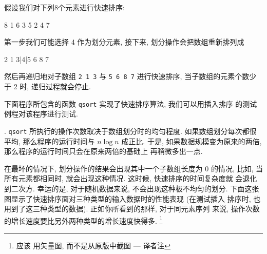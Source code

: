 假设我们对下列8个元素进行快速排序:
\begin{file}
    8 1 6 3 5 2 4 7
\end{file}
第一步我们可能选择 4 作为划分元素, 接下来, 划分操作会把数组重新排列成
\begin{file}
    2 1 3|4|5 6 8 7
\end{file}
然后再递归地对子数组 \texttt{2 1 3} 与 \texttt{5 6 8 7} 进行快速排序,
当子数组的元素个数少于 2 时, 递归过程就会停止.

下面程序所包含的函数 \texttt{qsort} 实现了快速排序算法, 我们可以用插入排序
的测试例程对该程序进行测试.

. \texttt{qsort} 所执行的操作次数取决于数组划分时的均匀程度.
如果数组划分每次都很平均, 那么程序的运行时间与 $n \log n$ 成正比.
于是, 如果数据规模变为原来的两倍, 那么程序的运行时间只会在原来两倍的基础上
再稍微多出一点.

在最坏的情况下, 划分操作的结果会出现其中一个子数组长度为 0 的情况, 比如,
当所有元素都相同时, 就会出现这种情况. 这时候, 快速排序的时间复杂度就
会退化到二次方. 幸运的是, 对于随机数据来说, 不会出现这种极不均匀的划分. 
下面这张图显示了快速排序面对三种类型的输入数据时的性能表现 (在测试插入
排序时, 也用到了这三种类型的数据). 正如你所看到的那样, 对于同元素序列
来说, 操作次数的增长速度要比另外两种类型的增长速度快得多. \footnote{应该 
用矢量图, 而不是从原版中截图 --- 译者注}

